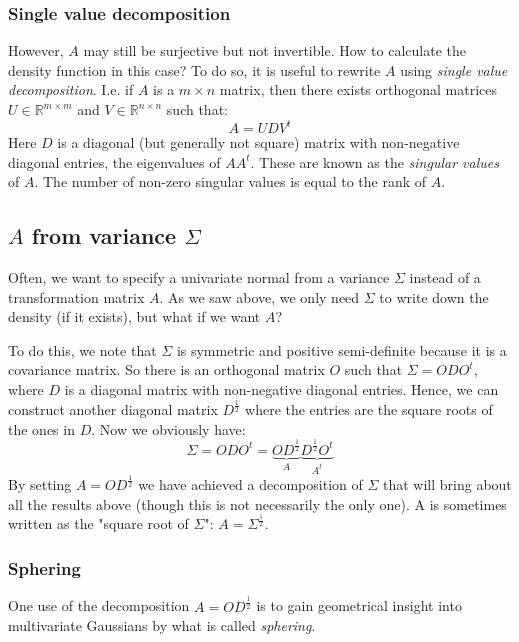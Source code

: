 \documentclass[12pt, a4paper]{article}
\numberwithin{equation}{section}
\begin{document}
\subsubsection{Single value decomposition}
However, $A$ may still be surjective but not invertible. How to calculate the density function in this case? To do so, it is useful to rewrite $A$ using \textit{single value decomposition}. I.e. if $A$ is a $m\times n$ matrix, then there exists orthogonal matrices $U\in\mathbb{R}^{m\times m}$ and $V\in\mathbb{R}^{n\times n}$ such that:
\begin{equation}
A=UDV^t
\end{equation}
Here $D$ is a diagonal (but generally not square) matrix with non-negative diagonal entries, the eigenvalues of $AA^t$. These are known as the \textit{singular values} of $A$. The number of non-zero singular values is equal to the rank of $A$.

\subsection{$A$ from variance $\Sigma$}
Often, we want to specify a univariate normal from a variance $\Sigma$ instead of a transformation matrix $A$. As we saw above, we only need $\Sigma$ to write down the density (if it exists), but what if we want $A$?

To do this, we note that $\Sigma$ is symmetric and positive semi-definite because it is a covariance matrix. So there is an orthogonal matrix $O$ such that $\Sigma=ODO^t$, where $D$ is a diagonal matrix with non-negative diagonal entries. Hence, we can construct another diagonal matrix $D^{\frac{1}{2}}$ where the entries are the square roots of the ones in $D$. Now we obviously have:
\begin{equation}
\Sigma=ODO^t=\underbrace{OD^{\frac{1}{2}}}_{A}\underbrace{D^{\frac{1}{2}}O^t}_{A^t}
\end{equation}
By setting $A=OD^{\frac{1}{2}}$ we have achieved a decomposition of $\Sigma$ that will bring about all the results above (though this is not necessarily the only one). A is sometimes written as the "square root of $\Sigma$": $A=\Sigma^{\frac{1}{2}}$.

\subsubsection{Sphering}
One use of the decomposition $A=OD^{\frac{1}{2}}$ is to gain geometrical insight into multivariate Gaussians by what is called \textit{sphering}.
\end{document}
